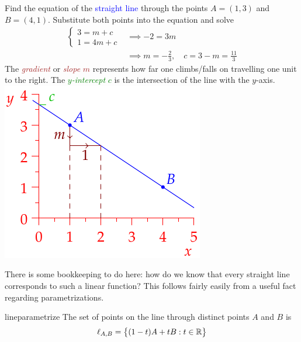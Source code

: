 \begin{example}[lower separated=false, sidebyside, sidebyside align=top seam, sidebyside gap=0pt, righthand width=0.35\linewidth]{}{}
Find the equation of the \textcolor{blue}{straight line} through the points $A=(1,3)$ and $B=(4,1)$.\smallbreak
Substitute both points into the equation and solve
\begin{align*}
\begin{cases}
3=m+c\\
1=4m+c
\end{cases}
&\implies -2=3m\\
&\implies m=-\frac 23,\quad c=3-m=\frac{11}3
\end{align*}
The \emph{\textcolor{Brown}{gradient}} or \textcolor{Brown}{\emph{slope} $m$} represents how far one climbs/falls on travelling one unit to the right.\smallbreak
The \textcolor{Green}{\emph{$y$-intercept} $c$} is the intersection of the line with the $y$-axis.
\tcblower
\flushright\includegraphics{line-line}
\end{example}

There is some bookkeeping to do here: how do we know that every straight line corresponds to such a linear function? This follows fairly easily from a useful fact regarding parametrizations.

\begin{thm}{}{lineparametrize}
The set of points on the line through distinct points $A$ and $B$ is
\[\ell_{A,B}=\bigl\{(1-t)A+tB:t\in\mathbb{R}\bigr\}\]
\end{thm}

